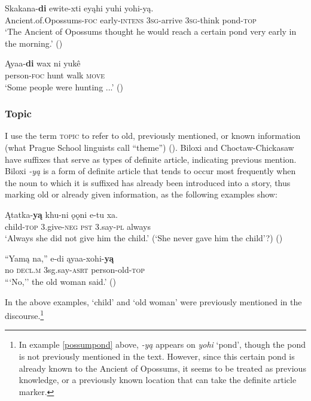 \documentclass[output=paper]{LSP/langsci}
\begin{document}
\ea\label{possumpond}
\gll 	Skakana-\textbf{di} ewite-xti eyąhi yuhi yohi-y\k{a}. \\
	Ancient.of.Opossums-\textsc{foc} early-\textsc{intens} \textsc{3sg}-arrive \textsc{3sg}-think pond-\textsc{top}\\
\glt `The Ancient of Opossums thought he would reach a certain pond very early in the morning.' (\citealt[26]{DorseySwanton1912})
\z

\ea
\gll	Ąyaa-\textbf{di} wax ni yukê \\
	person-\textsc{foc} hunt walk \textsc{move}\\
\glt `Some people were hunting ...' (\citealt[65]{DorseySwanton1912})
\z

\subsubsection{Topic}

I use the term \textsc{topic} to refer to old, previously mentioned, or known information (what Prague School linguists call “theme”) (\citealt[271]{Payne1997}). Biloxi and Choctaw-Chickasaw have suffixes that serve as types of definite article, indicating previous mention. Biloxi \emph{-yą} is a form of definite article that tends to occur most frequently when the noun to which it is suffixed has already been introduced into a story, thus marking old or already given information, as the following examples show: 

\ea
\gll	Ątatka-\textbf{yą } khu-ni 	 ǫǫni e-tu 	 xa.\\ 
child-\textsc{top} 3.give-\textsc{neg} \textsc{pst} 	 3.say-\textsc{pl} always \\
\glt `Always she did not give him the child.' (`She never gave him the child'?) (\citealt[43]{DorseySwanton2012})
\z

\ea
\gll	“Yamą na,” 	 e-di 	 ąyaa-xohi-\textbf{yą}\\
	\hspace{.6em}no 	\textsc{decl.m} 3sg.say-\textsc{asrt} person-old-\textsc{top} \\
\glt ```No,'' the old woman said.' (\citealt[67]{DorseySwanton2012})
\z

In the above examples, `child' and `old woman' were previously mentioned in the discourse.\footnote{In example \ref{possumpond} above, \emph{-yą} appears on \emph{yohi} `pond', though the pond is not previously mentioned in the text. However, since this certain pond is already known to the Ancient of Opossums, it seems to be treated as previous knowledge, or a previously known location that can take the definite article marker.}
\end{document}
